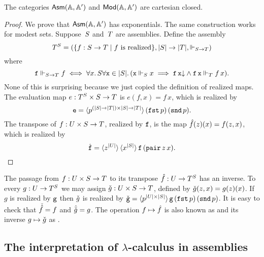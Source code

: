 \begin{proposition}
  \label{prop:asm-ccc}%
  The categories $\AsmA$ and $\ModA$ are cartesian closed.
\end{proposition}

\begin{proof}
  We prove that $\AsmA$ has exponentials. The same construction works
  for modest sets. Suppose~$\asm{S}$ and~$\asm{T}$ are assemblies.
  Define the assembly
  \begin{equation*}
    \asm{T}^{\asm{S}} =
    (\set{f : S \to T \such \text{$f$ is realized}},
     |S| \to |T|, {\rz[S \to T]})
  \end{equation*}
  where
  \begin{equation*}
    \R{f} \rz[S \to T] f
    \iff
    \all{x}{S}{
      \all{\R{x} \in |S|}
          (\R{x} \rz[S] x \implies
          \defined{\R{f}\,\R{x}} \land
          \R{f}\,\R{x} \rz[T] f\,x)
      }.
  \end{equation*}
  None of this is surprising because we just copied the definition of
  realized maps. The evaluation map $e : \asm{T}^{\asm{S}} \times
  \asm{S} \to \asm{T}$ is $e(f, x) = f\,x$, which is realized by
  \begin{equation*}
    \R{e} = \tpcalam{p}{(|S| \to |T|) \times |S| \to
      |T|}{(\combFst\,p)\,(\combSnd\,p)}.
  \end{equation*}
  The transpose of $f : \asm{U} \times \asm{S} \to \asm{T}$, realized
  by $\R{f}$, is the map $\curry{f}(z)(x) = f(z,x)$, which is realized
  by
  \begin{equation*}
    \curry{\R{f}} = \tpcalam{z}{|U|} \tpcalam{x}{|S|} \R{f}\,(\combPair\,z\,x).
    \qedhere
  \end{equation*}
\end{proof}

The passage from $f : \asm{U} \times \asm{S} \to \asm{T}$ to its
transpose $\curry{f} : \asm{U} \to \asm{T}^{\asm{S}}$ has an inverse.
To every $g : \asm{U} \to \asm{T}^{\asm{S}}$ we may assign
$\uncurry{g} : \asm{U} \times \asm{S} \to \asm{T}$, defined by
$\uncurry{g}(z,x) = g(z)(x)$. If $g$ is realized by $\R{g}$ then
$\uncurry{g}$ is realized by $\uncurry{\R{g}} = \tpcalam{p}{|U|
    \times |S|}{\R{g}\,(\combFst\,p)\,(\combSnd\,p)}$. It is easy to
check that $\uncurry{\curry{f}} = f$ and $\curry{\uncurry{g}} = g$.
The operation $f \mapsto \curry{f}$ is also known as 
and its inverse $g \mapsto \uncurry{g}$ as .

\subsection{The interpretation of $\lambda$-calculus in assemblies}
\label{sec:interpr-lambda-calc}

